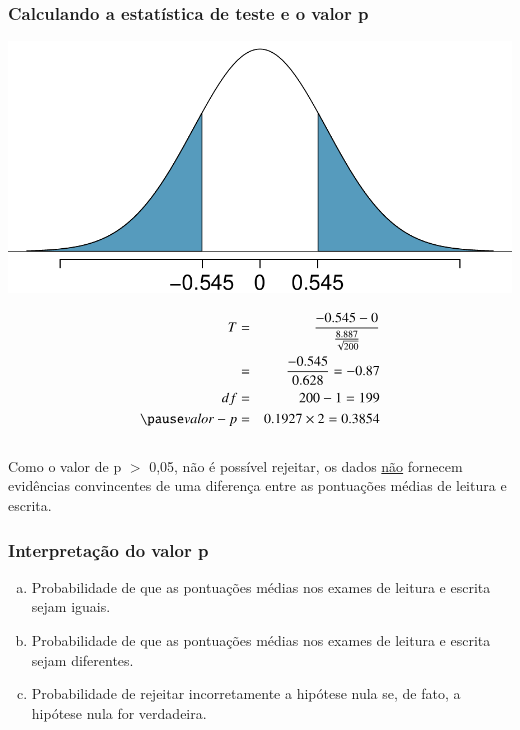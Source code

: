 \begin{frame}[shrink]
\frametitle{Calculando a estatística de teste e o valor p}
\justifying
{}

{
\begin{center}
\includegraphics[width=\textwidth]{5-2_paired/hsb2_read_write_pval.pdf}
\end{center}
}
{
\pause
\begin{eqnarray*}
T &=& \frac{-0.545 - 0}{\frac{8.887}{\sqrt{200}}} \\
&=& \frac{-0.545}{0.628} = -0.87 \\
df &=& 200 - 1 = 199 \\
\pause
valor-p &=& 0.1927 \times 2 = 0.3854
\end{eqnarray*}
}
\pause 
$\:$ \\
\justifying
Como o valor de p $> $ 0,05, não é possível rejeitar, os dados \underline {não} fornecem evidências convincentes de uma diferença entre as pontuações médias de leitura e escrita.

\end{frame}


\begin{frame}
\frametitle{Interpretação do valor p}
\justifying
{}

\begin{enumerate}[(a)]
\justifying
\item Probabilidade de que as pontuações médias nos exames de leitura e escrita sejam iguais.
\justifying
\item Probabilidade de que as pontuações médias nos exames de leitura e escrita sejam diferentes.
\justifying
{}
\justifying
\item Probabilidade de rejeitar incorretamente a hipótese nula se, de fato, a hipótese nula for verdadeira.
\end{enumerate}

\end{frame}

